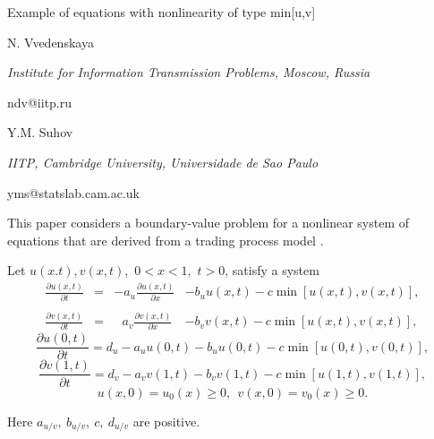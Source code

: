 \documentclass[10pt,a4paper]{article}
\begin{document}
\begin{center}

{\Large Example of equations with nonlinearity of type min[u,v]}
\bigskip

{\sc N. Vvedenskaya}

{\small\it Institute for Information Transmission Problems, Moscow, Russia}

{\small\rm ndv@iitp.ru }

\bigskip

{\sc Y.M. Suhov}

{\small\it IITP, Cambridge University,  Universidade de Sao Paulo}%

{\small\rm yms@statslab.cam.ac.uk}

\end{center}

\bigskip


This paper considers   a boundary-value problem for a nonlinear
system of equations that are derived from  a trading
process model \cite{VSB}.
\smallskip


Let $u(x.t),v(x,t)$,\ $0<x<1$,\ $t>0$, satisfy a system
\begin{equation}\label{vv-1}
\begin{array}{cclc}
\displaystyle{\frac{\partial u(x,t)}{\partial t
}}&=&-a_u\displaystyle{\frac{\partial u(x,t)}{\partial
x}}&-b_uu(x,t)-c\min[u(x,t), v(x,t)],
\\&&\\
\displaystyle{\frac{\partial v(x,t)}{\partial t }}&=&\ \ \
a_v\displaystyle{\frac{\partial v(x,t)}{\partial
x}}&-b_vv(x,t)-c\min[u(x,t), v(x,t)],
\end{array}
\end{equation}
\begin{equation}\label{vv-2}
\frac{\partial u(0,t)}{\partial t
}=d_u-a_uu(0,t)-b_uu(0,t)-c\min[u(0,t),v(0,t)],
\end{equation}
\begin{equation}\label{vv-3}
\frac{\partial v(1,t)}{\partial t
}=d_v-a_vv(1,t)-b_vv(1,t)-c\min[u(1,t),v(1,t)],
\end{equation}
\begin{equation}\label{vv-4}
u(x,0)=u_0(x)\geq 0,\ \ v(x,0)=v_0(x)\geq 0.
\end{equation}

Here $a_{u/v},\ b_{u/v},\ c,\ d_{u/v}$ are positive.
\end{document}

